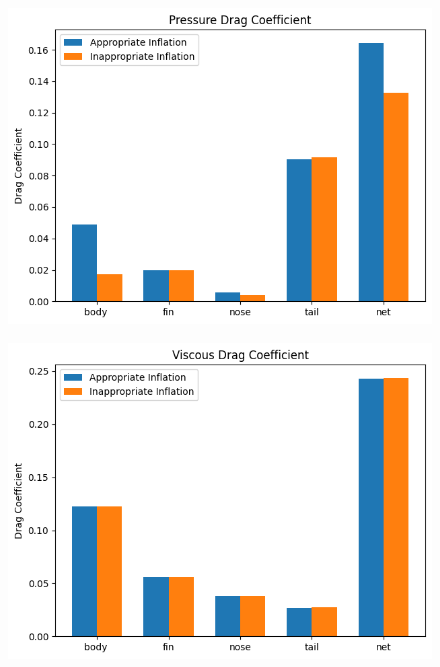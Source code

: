 \documentclass[uplatex,dvipdfmx,a4j,12pt]{jsarticle}
\begin{document}
\begin{figure}[H]
  \centering
  \begin{minipage}{0.45\linewidth}
      \centering
      \includegraphics[width=\linewidth]{wall_function/img/4_3_1_pressure_drag.png}
      \label{fig:4_3_1_cd_pressure}
  \end{minipage}
  \begin{minipage}{0.45\linewidth}
      \centering
      \includegraphics[width=\linewidth]{wall_function/img/4_3_1_viscous_drag.png}
      \label{fig:4_3_1_cd_viscous}
  \end{minipage}
  \begin{minipage}{0.45\linewidth}

\end{minipage}
\end{figure}
\end{document}
